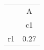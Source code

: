 \begin{tabular}{l*{1}{c}}
\hline\hline
            &           A\\
            &          c1\\
\hline
r1          &        0.27\\
\hline\hline
\end{tabular}
